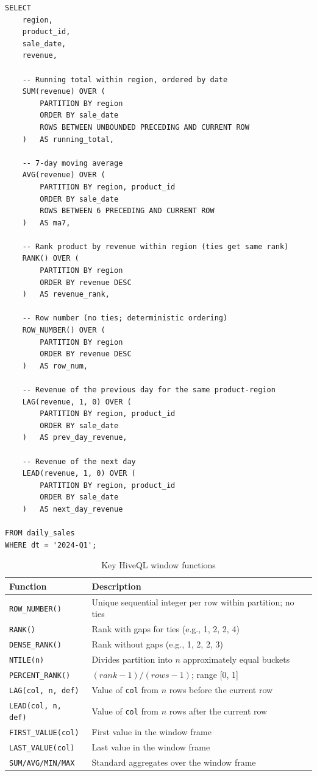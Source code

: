 \begin{lstlisting}[style=hiveql, caption={HiveQL: window functions for sales ranking and trends}]
SELECT
    region,
    product_id,
    sale_date,
    revenue,

    -- Running total within region, ordered by date
    SUM(revenue) OVER (
        PARTITION BY region
        ORDER BY sale_date
        ROWS BETWEEN UNBOUNDED PRECEDING AND CURRENT ROW
    )   AS running_total,

    -- 7-day moving average
    AVG(revenue) OVER (
        PARTITION BY region, product_id
        ORDER BY sale_date
        ROWS BETWEEN 6 PRECEDING AND CURRENT ROW
    )   AS ma7,

    -- Rank product by revenue within region (ties get same rank)
    RANK() OVER (
        PARTITION BY region
        ORDER BY revenue DESC
    )   AS revenue_rank,

    -- Row number (no ties; deterministic ordering)
    ROW_NUMBER() OVER (
        PARTITION BY region
        ORDER BY revenue DESC
    )   AS row_num,

    -- Revenue of the previous day for the same product-region
    LAG(revenue, 1, 0) OVER (
        PARTITION BY region, product_id
        ORDER BY sale_date
    )   AS prev_day_revenue,

    -- Revenue of the next day
    LEAD(revenue, 1, 0) OVER (
        PARTITION BY region, product_id
        ORDER BY sale_date
    )   AS next_day_revenue

FROM daily_sales
WHERE dt = '2024-Q1';
\end{lstlisting}

\begin{table}[h!t]
\centering
\caption{Key HiveQL window functions}
\label{tab:window-functions}
\renewcommand{\arraystretch}{1.5}
\begin{tabular}{L{3.2cm} L{7.2cm}}
\toprule
\textbf{Function} & \textbf{Description} \\
\midrule
\texttt{ROW\_NUMBER()}    & Unique sequential integer per row within partition; no ties \\
\texttt{RANK()}           & Rank with gaps for ties (e.g., 1, 2, 2, 4) \\
\texttt{DENSE\_RANK()}    & Rank without gaps (e.g., 1, 2, 2, 3) \\
\texttt{NTILE(n)}         & Divides partition into $n$ approximately equal buckets \\
\texttt{PERCENT\_RANK()}  & $(rank - 1) / (rows - 1)$; range [0, 1] \\
\texttt{LAG(col, n, def)} & Value of \texttt{col} from $n$ rows before the current row \\
\texttt{LEAD(col, n, def)} & Value of \texttt{col} from $n$ rows after the current row \\
\texttt{FIRST\_VALUE(col)} & First value in the window frame \\
\texttt{LAST\_VALUE(col)}  & Last value in the window frame \\
\texttt{SUM/AVG/MIN/MAX}  & Standard aggregates over the window frame \\
\bottomrule
\end{tabular}
\end{table}


